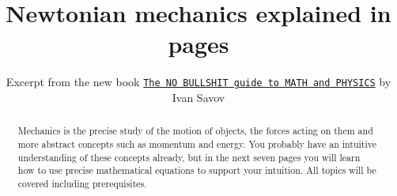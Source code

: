 \documentclass[letterpaper,9pt,journal]{IEEEtran}
\title{ \Huge Newtonian mechanics explained in \fourrr pages}
\author{Excerpt from the new book \href{http://minireference.com/}{\texttt{The NO BULLSHIT guide to MATH and PHYSICS}} by Ivan Savov}
\date{}
\def\fourrr{seven }
\begin{document}
\maketitle


%

  

\begin{abstract}
Mechanics is the precise study of the motion of objects, the forces acting
on them and more abstract concepts such as momentum and energy.
You probably have an intuitive understanding of these concepts already,
but in the next \fourrr pages you will learn how to use precise mathematical
equations to support your intuition. All topics will be covered including prerequisites.
\end{abstract}



%

%
\end{document}
